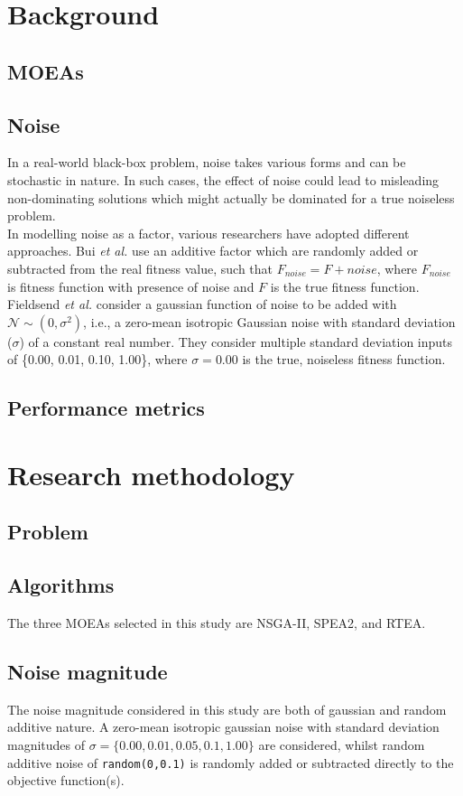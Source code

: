 \documentclass[conference]{IEEEtran}
\begin{document}
\section{Background}
\subsection{MOEAs}

\subsection{Noise}
In a real-world black-box problem, noise takes various forms and can be stochastic in nature. In such cases, the effect of noise could lead to misleading non-dominating solutions which might actually be dominated for a true noiseless problem. \\
In modelling noise as a factor, various researchers have adopted different approaches. Bui \textit{et al.} \cite{bui2005} use an additive factor which are randomly added or subtracted from the real fitness value, such that $F_{noise} = F + noise$, where $F_{noise}$ is fitness function with presence of noise and $F$ is the true fitness function. Fieldsend \textit{et al.} \cite{fieldsend2015} consider a gaussian function of noise to be added with $\mathcal{N} \sim (0, \sigma^{2})$, i.e., a zero-mean isotropic Gaussian noise with standard deviation ($\sigma$) of a constant real number. They consider multiple standard deviation inputs of \{0.00, 0.01, 0.10, 1.00\}, where $\sigma = 0.00$ is the true, noiseless fitness function.
\subsection{Performance metrics}


\section{Research methodology}
\subsection{Problem}

\subsection{Algorithms}
The three MOEAs selected in this study are NSGA-II, SPEA2, and RTEA.
\subsection{Noise magnitude}
The noise magnitude considered in this study are both of gaussian and random additive nature. A zero-mean isotropic gaussian noise with standard deviation magnitudes of $\sigma = \{0.00, 0.01, 0.05, 0.1, 1.00\}$ are considered, whilst random additive noise of \verb|random(0,0.1)| is randomly added or subtracted directly to the objective function(s).
\end{document}
